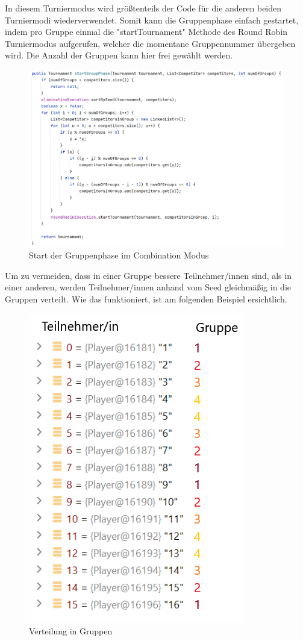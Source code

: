 In diesem Turniermodus wird größtenteils der Code für die anderen beiden Turniermodi wiederverwendet. Somit kann die Gruppenphase einfach gestartet, 
indem pro Gruppe einmal die "startTournament" Methode des Round Robin Turniermodus aufgerufen, welcher die momentane Gruppennummer übergeben wird. 
Die Anzahl der Gruppen kann hier frei gewählt werden.

\begin{figure}[H]
    \includegraphics[scale=0.4]{pics/backend/combination/combination_startGroupPhase.png}
    \caption{Start der Gruppenphase im Combination Modus}
\end{figure}

Um zu vermeiden, dass in einer Gruppe bessere Teilnehmer/innen sind, als in einer anderen, werden Teilnehmer/innen anhand vom Seed gleichmäßig in die Gruppen verteilt. Wie das funktioniert, ist am folgenden Beispiel ersichtlich.

\begin{figure}[H]
    \includegraphics[scale=0.8]{pics/backend/combination/combination_group_distribution.png}
    \caption{Verteilung in Gruppen}
\end{figure}

